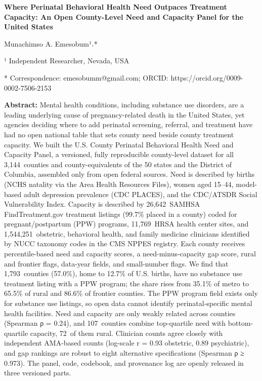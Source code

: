 \documentclass{article}
\begin{document}
\begin{center}
\textbf{Where Perinatal Behavioral Health Need Outpaces Treatment Capacity: An Open County-Level Need and Capacity Panel for the United States}
\end{center}

\begin{center}
Munachimso A. Emesobum¹˒*
\end{center}

¹ Independent Researcher, Nevada, USA

* Correspondence: emesobumm@gmail.com; ORCID: https://orcid.org/0009-0002-7506-2153

\textbf{Abstract:} Mental health conditions, including substance use disorders, are a leading underlying cause of pregnancy-related death in the United States, yet agencies deciding where to add perinatal screening, referral, and treatment have had no open national table that sets county need beside county treatment capacity. We built the U.S. County Perinatal Behavioral Health Need and Capacity Panel, a versioned, fully reproducible county-level dataset for all 3,144\ counties and county-equivalents of the 50 states and the District of Columbia, assembled only from open federal sources. Need is described by births (NCHS natality via the Area Health Resources Files), women aged 15--44, model-based adult depression prevalence (CDC PLACES), and the CDC/ATSDR Social Vulnerability Index. Capacity is described by 26,642\ SAMHSA FindTreatment.gov treatment listings (99.7\% placed in a county) coded for pregnant/postpartum (PPW) programs, 11,769\ HRSA health center sites, and 1,544,251\ obstetric, behavioral health, and family medicine clinicians identified by NUCC taxonomy codes in the CMS NPPES registry. Each county receives percentile-based need and capacity scores, a need-minus-capacity gap score, rural and frontier flags, data-year fields, and small-number flags. We find that 1,793\ counties (57.0\%), home to 12.7\% of U.S. births, have no substance use treatment listing with a PPW program; the share rises from 35.1\% of metro to 65.5\% of rural and 86.6\% of frontier counties. The PPW program field exists only for substance use listings, so open data cannot identify perinatal-specific mental health facilities. Need and capacity are only weakly related across counties (Spearman ρ = 0.24), and 107\ counties combine top-quartile need with bottom-quartile capacity, 72\ of them rural. Clinician counts agree closely with independent AMA-based counts (log-scale r = 0.93 obstetric, 0.89 psychiatric), and gap rankings are robust to eight alternative specifications (Spearman ρ ≥ 0.973). The panel, code, codebook, and provenance log are openly released in three versioned parts.
\end{document}
